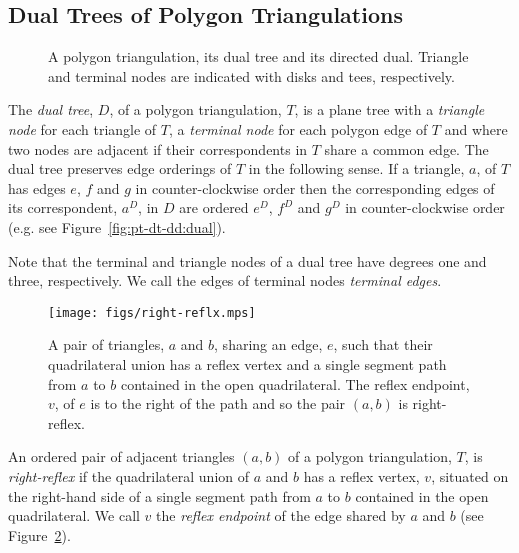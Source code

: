 \documentclass[11pt]{amsart}
\begin{document}

\subsection{Dual Trees of Polygon Triangulations}

\begin{figure}[htb]
  \centering
  \quad
  \quad
  \caption{\protect{} A polygon
    triangulation, \protect{} its dual tree
    and \protect{} its directed dual.  Triangle
    and terminal nodes are indicated with disks and tees,
    respectively.}
  \label{fig:pt-dt-dd}
\end{figure}

The \emph{dual tree}, $D$, of a polygon triangulation, $T$, is a plane
tree with a \emph{triangle node} for each triangle of $T$, a
\emph{terminal node} for each polygon edge of $T$ and where two nodes
are adjacent if their correspondents in $T$ share a common edge.  The
dual tree preserves edge orderings of $T$ in the following sense.  If
a triangle, $a$, of $T$ has edges $e$, $f$ and $g$ in
counter-clockwise order then the corresponding edges of its
correspondent, $a^D$, in $D$ are ordered $e^D$, $f^D$ and $g^D$ in
counter-clockwise order (e.g. see Figure~\ref{fig:pt-dt-dd:dual}).

Note that the terminal and triangle nodes of a dual tree have degrees
one and three, respectively.  We call the edges of terminal nodes
\emph{terminal edges}.


\begin{figure}[htb]
  \centering
  \texttt{[image: figs/right-reflx.mps]}
  \caption{A pair of triangles, $a$ and $b$, sharing an edge, $e$,
    such that their quadrilateral union has a reflex vertex and a
    single segment path from $a$ to $b$ contained in the open
    quadrilateral.  The reflex endpoint, $v$, of $e$ is to the right
    of the path and so the pair $(a,b)$ is right-reflex.}
  \label{fig:rrefl}
\end{figure}

An ordered pair of adjacent triangles $(a,b)$ of a polygon
triangulation, $T$, is \emph{right-reflex} if the quadrilateral union
of $a$ and $b$ has a reflex vertex, $v$, situated on the right-hand
side of a single segment path from $a$ to $b$ contained in the open
quadrilateral.  We call $v$ the \emph{reflex endpoint} of the edge
shared by $a$ and $b$ (see Figure~\ref{fig:rrefl}).
\end{document}

